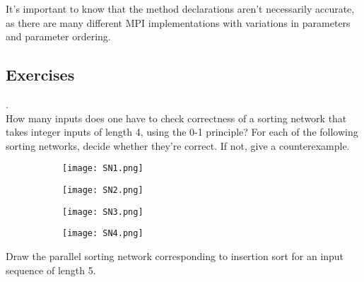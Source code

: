 \documentclass[main]{subfiles}
\begin{document}
It's important to know that the method declarations aren't necessarily accurate, as there are many different MPI implementations with variations in parameters and parameter ordering.

\newpage

\subsection{Exercises}
\begin{ExerciseList}
    \Exercise[title={Sorting Networks},label=SN].\quad \\
        \Question How many inputs does one have to check correctness of a sorting network that takes integer inputs of length 4, using the 0-1 principle?
        \Question For each of the following sorting networks, decide whether they're correct. If not, give a counterexample.
            \begin{figure}[H]
                \centering
                \begin{subfigure}{.5\textwidth}
                    \centering
                    \texttt{[image: SN1.png]}
                    \caption{}
                \end{subfigure}%
                \begin{subfigure}{.5\textwidth}
                    \centering
                    \texttt{[image: SN2.png]}
                    \caption{}
                \end{subfigure}
                \begin{subfigure}{.5\textwidth}
                    \centering
                    \texttt{[image: SN3.png]}
                    \caption{}
                \end{subfigure}%
                \begin{subfigure}{.5\textwidth}
                    \centering
                    \texttt{[image: SN4.png]}
                    \caption{}
                \end{subfigure}
            \end{figure}
        \Question Draw the parallel sorting network corresponding to insertion sort for an input sequence of length 5.
    

\end{ExerciseList}
\end{document}
